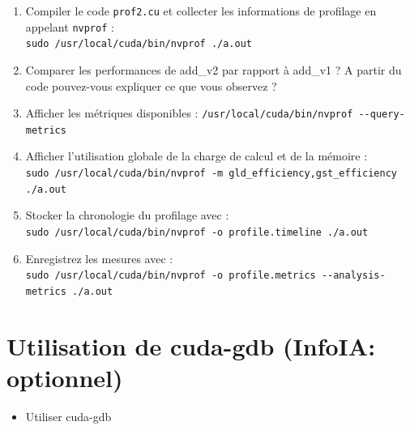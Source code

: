 \begin{wtodo}{}

	\begin{enumerate}
		\item  Compiler le code {\tt prof2.cu} et collecter les informations de profilage en appelant {\tt nvprof} : \\{\tt sudo /usr/local/cuda/bin/nvprof ./a.out }
		\item  Comparer les performances de add\_v2 par rapport à add\_v1 ? A partir du code pouvez-vous expliquer ce que vous observez ?
		\item  Afficher les métriques disponibles : {\tt /usr/local/cuda/bin/nvprof -{}-query-metrics}
		\item  Afficher l'utilisation globale de la charge de calcul et de la mémoire : \\{\tt sudo /usr/local/cuda/bin/nvprof -m gld\_efficiency,gst\_efficiency ./a.out }
		\item Stocker la chronologie du profilage avec :\\ {\tt sudo /usr/local/cuda/bin/nvprof -o profile.timeline ./a.out}
		\item Enregistrez les mesures avec :\\ {\tt sudo /usr/local/cuda/bin/nvprof -o profile.metrics -{}-analysis-metrics ./a.out}
	\end{enumerate}

\end{wtodo}
\newpage

  \section{Utilisation de cuda-gdb (InfoIA: optionnel)}

\begin{objectif}[]{}
 \begin{itemize}
	\item Utiliser cuda-gdb
\end{itemize}
\end{objectif}

